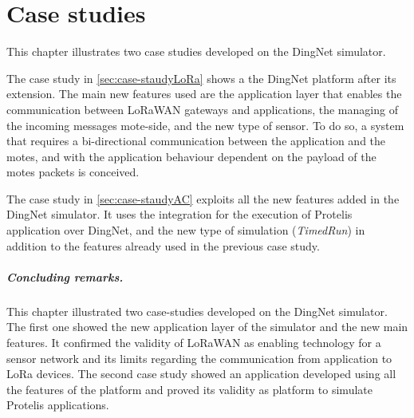 \chapter{Case studies}
\label{chap:case-studies}
This chapter illustrates two case studies developed on the DingNet simulator.

The case study in \cref{sec:case-staudyLoRa} shows a the DingNet platform after its extension.
The main new features used are the application layer that enables the communication between LoRaWAN gateways and applications, the managing of the incoming messages mote-side, and the new type of sensor.  
To do so, a system that requires a bi-directional communication between the application and the motes, and with the application behaviour dependent on the payload of the motes packets is conceived.

The case study in \cref{sec:case-staudyAC} exploits all the new features added in the DingNet simulator.
It uses the integration for the execution of Protelis application over DingNet, and the new type of simulation (\textit{TimedRun}) in addition to the features already used in the previous case study.





\paragraph{Concluding remarks.} This chapter illustrated two case-studies developed on the DingNet simulator.
The first one showed the new application layer of the simulator and the new main features. It confirmed the validity of LoRaWAN as enabling technology for a sensor network and its limits regarding the communication from application to LoRa devices.
The second case study showed an application developed using all the features of the platform and proved its validity as platform to simulate Protelis applications.


